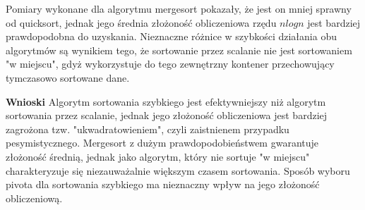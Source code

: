 \documentclass[10pt, a4paper]{article}
\begin{document}
\begin{flushleft}
Pomiary wykonane dla algorytmu mergesort pokazały, że jest on mniej sprawny od quicksort, jednak jego średnia złożoność obliczeniowa rzędu $nlogn$ jest bardziej prawdopodobna do uzyskania. Nieznaczne różnice w szybkości działania obu algorytmów są wynikiem tego, że sortowanie przez scalanie nie jest sortowaniem "w miejscu", gdyż wykorzystuje do tego zewnętrzny kontener przechowujący tymczasowo sortowane dane. \newline \newline

\textbf{Wnioski} \newline \newline
Algorytm sortowania szybkiego jest efektywniejszy niż algorytm sortowania przez scalanie, jednak jego złożoność obliczeniowa jest bardziej zagrożona tzw. "ukwadratowieniem", czyli zaistnienem przypadku pesymistycznego. Mergesort z dużym prawdopodobieństwem gwarantuje złożoność średnią, jednak jako algorytm, który nie sortuje "w miejscu" charakteryzuje się niezauważalnie większym czasem sortowania. Sposób wyboru pivota dla sortowania szybkiego ma nieznaczny wpływ na jego złożoność obliczeniową.
\end{flushleft}
\end{document}
